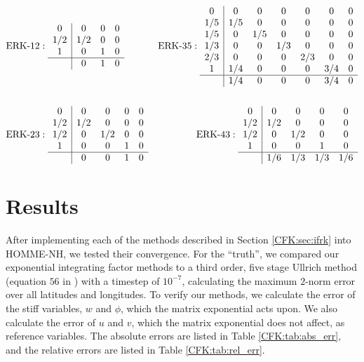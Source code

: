 \documentclass{csri19}
\begin{document}
\begin{align*}&\text{ERK-}12:
 \begin{array}{c|ccc}
0   & 0   & 0 & 0\\
1/2 & 1/2 & 0 & 0\\
1   & 0   & 1 & 0\\
\hline
    & 0   & 1 & 0
\end{array}
& \text{ERK-}35: 
\begin{array}{c|cccccc}
0   & 0   & 0   & 0   & 0   & 0   & 0\\
1/5 & 1/5 & 0   & 0   & 0   & 0   & 0\\
1/5 & 0   & 1/5 & 0   & 0   & 0   & 0\\
1/3 & 0   & 0   & 1/3 & 0   & 0   & 0\\
2/3 & 0   & 0   & 0   & 2/3 & 0   & 0\\
1   & 1/4 & 0   & 0   & 0   & 3/4 & 0\\
\hline
    & 1/4 & 0   & 0   & 0   & 3/4 & 0
\end{array}\\
\\
&\text{ERK-}23: 
\begin{array}{c|cccc}
0   & 0   & 0   & 0 & 0\\
1/2 & 1/2 & 0   & 0 & 0\\
1/2 & 0   & 1/2 & 0 & 0\\
1   & 0   & 0   & 1 & 0\\
\hline
    & 0   & 0   & 1 & 0
\end{array}
& \text{ERK-}43: 
\begin{array}{c|cccc}
0   & 0   & 0   & 0   & 0 \\
1/2 & 1/2 & 0   & 0   & 0 \\
1/2 & 0   & 1/2 & 0   & 0 \\
1   & 0   & 0   & 1   & 0 \\
\hline
    & 1/6 & 1/3 & 1/3 & 1/6
\end{array} 
\end{align*}

\section{Results}\label{CFK:sec:results}
After implementing each of the methods described in Section 
\ref{CFK:sec:ifrk} into HOMME-NH, we tested their convergence. For the 
``truth'', we compared our exponential integrating factor methods to a 
third order, five stage Ullrich method (equation $56$ in 
\cite{CFK:Guerra2016}) with a timestep of $10^{-7}$, calculating the 
maximum $2$-norm error over all latitudes and longitudes. To verify our 
methods, we calculate the error of the stiff variables, $w$ and $\phi$, 
which the matrix exponential acts upon. We also calculate the error of $u$ 
and $v$, which the matrix exponential does not affect, as reference 
variables. The absolute errors are listed in Table \ref{CFK:tab:abs_err}, 
and the relative errors are listed in Table \ref{CFK:tab:rel_err}.
\end{document}
